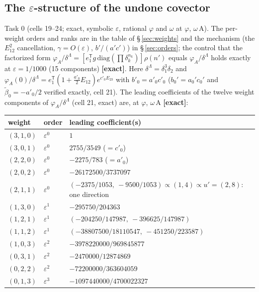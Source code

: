 \documentclass[10pt]{article}
\begin{document}
\subsection{The $\varepsilon$-structure of the undone covector}\label{sec:a310eps}

Task 0 (cells 19--24; exact, symbolic $\varepsilon$, rational $\varphi$ and $\omega$ at $\varphi$, $\omega\,\mathrm{A}$). The per-weight orders and ranks are in the table of \S\,\ref{sec:weights} and the mechanism (the $E_{12}^2$ cancellation, $\gamma=O(\varepsilon)$, $b'/(a'c')$) in \S\,\ref{sec:orders}; the control that the factorized form $\varphi_A/\delta^\Lambda=[e_1^{\mathsf T}g\,\mathrm{diag}(\prod\delta_k^{n_k})]\rho(n')$ equals $\varphi_A/\delta^\Lambda$ holds exactly at $\varepsilon=1/1000$ (15 components) \textbf{[exact]}. Here $\delta^\Lambda=\delta_1^3\delta_2$ and $\varphi_A(0)/\delta^\Lambda=e_1^{\mathsf T}(1+\frac{a'_0}{2}E_{12})e^{c'_0E_{23}}$ with $b'_0=a'_0c'_0$ ($b_0'=a_0'c_0'$ and $\tilde\beta_0=-a'_0/2$ verified exactly, cell 21). The leading coefficients of the twelve weight components of $\varphi_A/\delta^\Lambda$ (cell 21, exact) are, at $\varphi$, $\omega\,\mathrm{A}$ \textbf{[exact]}:

\begin{center}\footnotesize\setlength{\tabcolsep}{3pt}\begin{longtable}{@{}p{2.2cm}p{1.6cm}p{9.0cm}@{}}\toprule
\textbf{weight} & \textbf{order} & \textbf{leading coefficient(s)} \\\midrule\endhead
$(3,1,0)$ & $\varepsilon^0$ & $1$ \\
$(3,0,1)$ & $\varepsilon^0$ & $2755/3549$ ($=c'_0$) \\
$(2,2,0)$ & $\varepsilon^0$ & $-2275/783$ ($=a'_0$) \\
$(2,0,2)$ & $\varepsilon^0$ & $-26172500/3737097$ \\
$(2,1,1)$ & $\varepsilon^0$ & $(-2375/1053,\ -9500/1053)\propto(1,4)\propto u'=(2,8)$: one direction \\
$(1,3,0)$ & $\varepsilon^1$ & $-295750/204363$ \\
$(1,2,1)$ & $\varepsilon^1$ & $(-204250/147987,\ -396625/147987)$ \\
$(1,1,2)$ & $\varepsilon^1$ & $(-38807500/18110547,\ -451250/223587)$ \\
$(1,0,3)$ & $\varepsilon^2$ & $-3978220000/969845877$ \\
$(0,3,1)$ & $\varepsilon^2$ & $-2470000/12874869$ \\
$(0,2,2)$ & $\varepsilon^2$ & $-72200000/363604059$ \\
$(0,1,3)$ & $\varepsilon^3$ & $-1097440000/4700022327$ \\
\bottomrule\end{longtable}\end{center}
\end{document}
